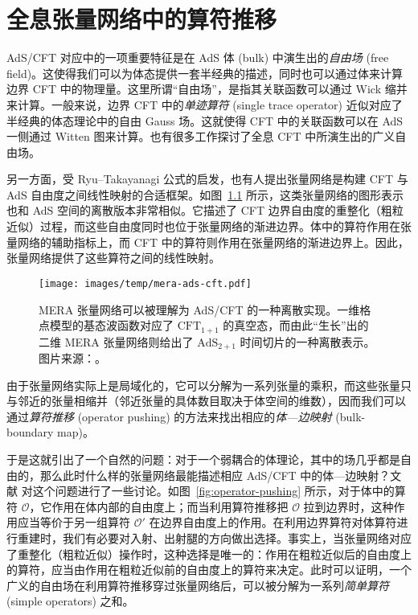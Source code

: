 \chapter{全息张量网络中的算符推移}
\label{chap:operator-pushing}

AdS/CFT 对应\cite{maldacena1999large}中的一项重要特征是在 AdS 体 (bulk) 中演生出的\emph{自由场} (free field)。这使得我们可以为体态提供一套半经典的描述，同时也可以通过体来计算边界 CFT 中的物理量。这里所谓“自由场”，是指其关联函数可以通过 Wick 缩并来计算。一般来说，边界 CFT 中的\emph{单迹算符} (single trace operator) 近似对应了半经典的体态理论中的自由 Gauss 场。这就使得 CFT 中的关联函数可以在 AdS 一侧通过 Witten 图来计算\cite{witten1998anti,gubser1998gauge}。也有很多工作探讨了全息 CFT 中所演生出的广义自由场\cite{dutsch2003generalized,liu2019dimensional,collier2019quantum,nebabu2023bulk}。

另一方面，受 Ryu--Takayanagi 公式\cite{ryu2006holographic}的启发，也有人提出张量网络是构建 CFT 与 AdS 自由度之间线性映射的合适框架\cite{swingle2012entanglement}。如图~\ref{fig:mera-ads-cft} 所示，这类张量网络的图形表示也和 AdS 空间的离散版本非常相似。它描述了 CFT 边界自由度的重整化（粗粒近似）过程，而这些自由度同时也位于张量网络的渐进边界。体中的算符作用在张量网络的辅助指标上，而 CFT 中的算符则作用在张量网络的渐进边界上。因此，张量网络提供了这些算符之间的线性映射\cite{pastawski2015holographic,hayden2016holographic}。

\begin{figure}[htb]
  \centering
  \texttt{[image: images/temp/mera-ads-cft.pdf]}
  \caption[MERA 张量网络与 AdS/CFT]{MERA 张量网络可以被理解为 AdS/CFT 的一种离散实现。一维格点模型的基态波函数对应了 $\text{CFT}_{1+1}$ 的真空态，而由此“生长”出的二维 MERA 张量网络则给出了 $\text{AdS}_{2+1}$ 时间切片的一种离散表示。图片来源：\parencite{evenbly2011tensor}。}
  \label{fig:mera-ads-cft}
\end{figure}

由于张量网络实际上是局域化的，它可以分解为一系列张量的乘积，而这些张量只与邻近的张量相缩并（邻近张量的具体数目取决于体空间的维数），因而我们可以通过\emph{算符推移} (operator pushing) 的方法来找出相应的\emph{体—边映射} (bulk-boundary map)\cite{pastawski2015holographic,bhattacharyya2016exploring,bhattacharyya2018tensor}。

于是这就引出了一个自然的问题：对于一个弱耦合的体理论，其中的场几乎都是自由的，那么此时什么样的张量网络最能描述相应 AdS/CFT 中的体—边映射？文献 \parencite{bhattacharyya2018tensor} 对这个问题进行了一些讨论。如图~\ref{fig:operator-pushing} 所示，对于体中的算符 $\mathcal{O}$，它作用在体内部的自由度上；而当利用算符推移把 $\mathcal{O}$ 拉到边界时，这种作用应当等价于另一组算符 $\mathcal{O}'$ 在边界自由度上的作用。在利用边界算符对体算符进行重建时，我们有必要对入射、出射腿的方向做出选择。事实上，当张量网络对应了重整化（粗粒近似）操作时，这种选择是唯一的：作用在粗粒近似后的自由度上的算符，应当由作用在粗粒近似前的自由度上的算符来决定。此时可以证明，一个广义的自由场在利用算符推移穿过张量网络后，可以被分解为一系列\emph{简单算符} (simple operators) 之和\cite{bhattacharyya2018tensor}。

